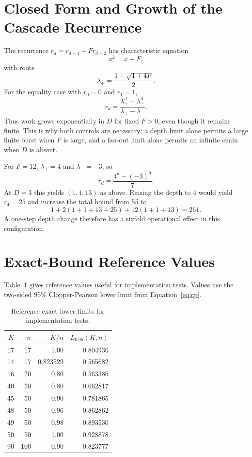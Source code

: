 \documentclass[11pt]{article}
\begin{document}
\appendix

\section{Closed Form and Growth of the Cascade Recurrence}

The recurrence $r_d=r_{d-1}+F r_{d-2}$ has characteristic equation
\[
 x^2=x+F,
\]
with roots
\[
 \lambda_{\pm}=\frac{1\pm\sqrt{1+4F}}{2}.
\]
For the equality case with $r_0=0$ and $r_1=1$,
\[
 r_d=\frac{\lambda_+^d-\lambda_-^d}{\lambda_+-\lambda_-}.
\]
Thus work grows exponentially in $D$ for fixed $F>0$, even though it remains finite. This is
why both controls are necessary: a depth limit alone permits a large finite burst when $F$
is large, and a fan-out limit alone permits an infinite chain when $D$ is absent.

For $F=12$, $\lambda_+=4$ and $\lambda_-=-3$, so
\[
 r_d=\frac{4^d-(-3)^d}{7}.
\]
At $D=3$ this yields $(1,1,13)$ as above. Raising the depth to 4 would yield $r_4=25$ and
increase the total bound from 55 to
\[
 1+2(1+1+13+25)+12(1+1+13)=261.
\]
A one-step depth change therefore has a sixfold operational effect in this configuration.

\section{Exact-Bound Reference Values}

Table~\ref{tab:reference} gives reference values useful for implementation tests. Values use
the two-sided 95\% Clopper-Pearson lower limit from Equation~\eqref{eq:cp}.

\begin{table}[ht]
\centering
\caption{Reference exact lower limits for implementation tests.}
\label{tab:reference}
\begin{tabular}{rrrr}
\toprule
$K$ & $n$ & $K/n$ & $L_{0.05}(K,n)$ \\
\midrule
17 & 17 & 1.00 & 0.804936 \\
14 & 17 & 0.823529 & 0.565682 \\
16 & 20 & 0.80 & 0.563386 \\
40 & 50 & 0.80 & 0.662817 \\
45 & 50 & 0.90 & 0.781865 \\
48 & 50 & 0.96 & 0.862862 \\
49 & 50 & 0.98 & 0.893530 \\
50 & 50 & 1.00 & 0.928878 \\
90 & 100 & 0.90 & 0.823777 \\
\bottomrule
\end{tabular}
\end{table}
\end{document}
